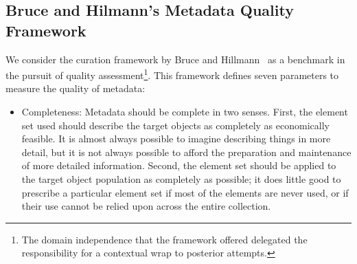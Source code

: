 \documentclass[epsfig,a4paper,12pt,titlepage]{book}
\begin{document}
\subsection{Bruce and Hilmann's Metadata Quality Framework}
\label{sub:b&h}
We consider the curation framework by Bruce and Hillmann~\cite{1} as a benchmark in the pursuit of quality assessment\footnote{The domain independence that the framework offered delegated the responsibility for a contextual wrap to posterior attempts.}.  This framework defines seven parameters to measure the quality of metadata:
\begin{itemize}	
\item Completeness: Metadata should be complete in two senses. First, the element set used should describe the target objects as completely as economically feasible. It is almost always possible to imagine describing things in more detail, but it is not always possible to afford the preparation and maintenance of more detailed information. Second, the element set should be applied to the target object population as completely as possible; it does little good to prescribe a particular element set if most of the elements are never used, or if their use cannot be relied upon across the entire collection.


\end{itemize}
\end{document}
